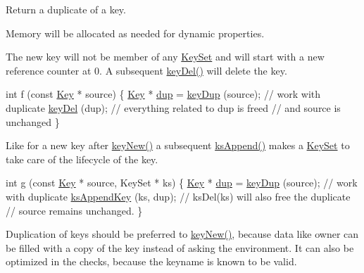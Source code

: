 Return a duplicate of a key.

Memory will be allocated as needed for dynamic properties.

The new key will not be member of any \hyperlink{classkdb_1_1KeySet}{Key\-Set} and will start with a new reference counter at 0. A subsequent \hyperlink{group__key_ga3df95bbc2494e3e6703ece5639be5bb1}{key\-Del()} will delete the key.


\begin{DoxyCode}
\textcolor{keywordtype}{int} f (\textcolor{keyword}{const} \hyperlink{classkdb_1_1Key_a5679f5cae63caddd64a60388b9cc77fa}{Key} * source)
\{
        \hyperlink{classkdb_1_1Key_a5679f5cae63caddd64a60388b9cc77fa}{Key} * \hyperlink{classkdb_1_1Key_a43a1f28d7a0d40f0ded8473d480931ff}{dup} = \hyperlink{group__key_gae6ec6a60cc4b8c1463fa08623d056ce3}{keyDup} (source);
        \textcolor{comment}{// work with duplicate}
        \hyperlink{group__key_ga3df95bbc2494e3e6703ece5639be5bb1}{keyDel} (dup);
        \textcolor{comment}{// everything related to dup is freed}
        \textcolor{comment}{// and source is unchanged}
\}
\end{DoxyCode}


Like for a new key after \hyperlink{group__key_gad23c65b44bf48d773759e1f9a4d43b89}{key\-New()} a subsequent \hyperlink{group__keyset_ga21eb9c3a14a604ee3a8bdc779232e7b7}{ks\-Append()} makes a \hyperlink{classkdb_1_1KeySet}{Key\-Set} to take care of the lifecycle of the key.


\begin{DoxyCode}
\textcolor{keywordtype}{int} g (\textcolor{keyword}{const} \hyperlink{classkdb_1_1Key_a5679f5cae63caddd64a60388b9cc77fa}{Key} * source, KeySet * ks)
\{
        \hyperlink{classkdb_1_1Key_a5679f5cae63caddd64a60388b9cc77fa}{Key} * \hyperlink{classkdb_1_1Key_a43a1f28d7a0d40f0ded8473d480931ff}{dup} = \hyperlink{group__key_gae6ec6a60cc4b8c1463fa08623d056ce3}{keyDup} (source);
        \textcolor{comment}{// work with duplicate}
        \hyperlink{group__keyset_gaa5a1d467a4d71041edce68ea7748ce45}{ksAppendKey} (ks, dup);
        \textcolor{comment}{// ksDel(ks) will also free the duplicate}
        \textcolor{comment}{// source remains unchanged.}
\}
\end{DoxyCode}


Duplication of keys should be preferred to \hyperlink{group__key_gad23c65b44bf48d773759e1f9a4d43b89}{key\-New()}, because data like owner can be filled with a copy of the key instead of asking the environment. It can also be optimized in the checks, because the keyname is known to be valid.


